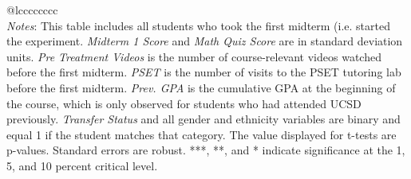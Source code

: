 \begin{tabular}{@{\extracolsep{5pt}}lcccccccc}
\hline \hline \\[-1.8ex]
{\textit{Notes}: This table includes all students who took the first midterm (i.e. started the  experiment.  \textit{Midterm 1 Score} and \textit{Math Quiz Score} are in standard  deviation units. \textit{Pre Treatment Videos} is the number of course-relevant  videos watched before the first midterm. \textit{PSET} is the number of visits  to the PSET tutoring lab before the first midterm. \textit{Prev. GPA} is the cumulative  GPA at the beginning of the course, which is only observed for students who had attended  UCSD previously. \textit{Transfer Status} and all gender and ethnicity variables  are binary and equal 1 if the student matches that category.  The value displayed for t-tests are p-values. Standard errors are robust. ***, **, and * indicate significance at the 1, 5, and 10 percent critical level. }
\end{tabular}
